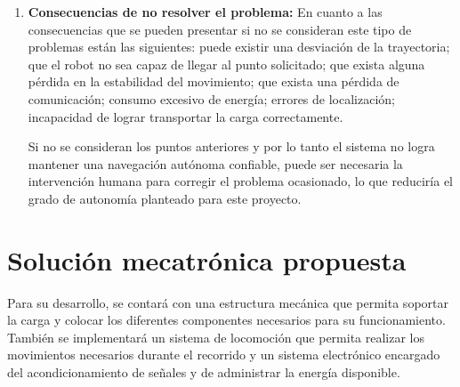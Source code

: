 \begin{enumerate}
    Para aquellas perturbaciones que pueden darse en el entorno, debemos considerar cosas como los obstáculos que pueden aparecer, así como la presencia de personas u objetos inesperados. Al mismo tiempo, aunque se plantea que el sistema trabajará en un entorno cerrado, es importante considerar momentos en los que exista mucha luz ambiental, cosa que puede dificultar el sistema de visión artificial que se esté implementando.
    
    También pueden existir algunas limitaciones con los sensores y a nivel computacional. En cuanto a los sensores, las principales limitaciones están asociadas con su precisión y distancia máxima de detección, ya que estos factores pueden afectar la información que recibe el robot sobre lo que se encuentra alrededor. Finalmente, la limitación computacional radica en el procesamiento de la información obtenida por los sensores. Aquí entran problemas como la latencia, el tiempo de respuesta entre cada componente, etc.

    \item \textbf{Consecuencias de no resolver el problema:} En cuanto a las consecuencias que se pueden presentar si no se consideran este tipo de problemas están las siguientes: puede existir una desviación de la trayectoria; que el robot no sea capaz de llegar al punto solicitado; que exista alguna pérdida en la estabilidad del movimiento; que exista una pérdida de comunicación; consumo excesivo de energía; errores de localización; incapacidad de lograr transportar la carga correctamente.
    
    Si no se consideran los puntos anteriores y por lo tanto el sistema no logra mantener una navegación autónoma confiable, puede ser necesaria la intervención humana para corregir el problema ocasionado, lo que reduciría el grado de autonomía planteado para este proyecto. 

\end{enumerate}

\section{Solución mecatrónica propuesta}
\label{sec:solucion-propuesta}

Para su desarrollo, se contará con una estructura mecánica que permita soportar la carga y colocar los diferentes componentes necesarios para su funcionamiento. También se implementará un sistema de locomoción que permita realizar los movimientos necesarios durante el recorrido y un sistema electrónico encargado del acondicionamiento de señales y de administrar la energía disponible.


